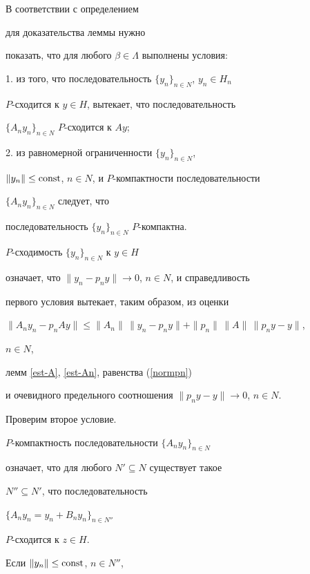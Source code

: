 \begin{pf}


В соответствии с определением \cite{209611220014} 


для доказательства леммы нужно 


показать, что для любого $\beta \in \Lambda$ выполнены условия:





1. из того, что последовательность $\{y_n \}_{n\in N}$, $y_n\in H_n$\;


$P$-сходится к $y \in H$, вытекает, что последовательность 


$\{A_n y_n \}_{n\in N}$\; $P$-сходится к $Ay$;





2. из равномерной ограниченности $\{y_n \}_{n\in N}$,


$\|y_n\|\le \operatorname{const}$, $n\in N$, и $P$-компактности последовательности 


$\{A_n y_n \}_{n\in N}$ следует, что 


последовательность $\{y_n \}_{n\in N}$\; $P$-компактна.





$P$-сходимость $\{y_n \}_{n\in N}$ к $y \in H$


означает, что $\|y_n-p_ny\|\to0$, $n\in N$, и справедливость


первого условия вытекает, таким образом, из оценки


$\|A_ny_n-p_nAy\| \le \|A_n\|\,\|y_n-p_ny\|+\|p_n\|\,\|A\|\,\|p_ny-y\|$,


$n\in N$,


лемм \ref{est-A}, \ref{est-An}, равенства (\ref{normpn})


и очевидного предельного соотношения $\|p_ny-y\|\to 0$, $n\in N$.





Проверим второе условие. 


$P$-компактность последовательности $\{A_ny_n \}_{n\in N}$ 


означает, что для любого $N'\subseteq N$ существует такое


$N''\subseteq N'$, что последовательность 


$\{A_ny_n=y_n+B_ny_n \}_{n\in N''}$\;


$P$-сходится к $z\in H$.


Если $\|y_n\|\le \operatorname{const}$, $n \in N''$, 



\end{pf}
